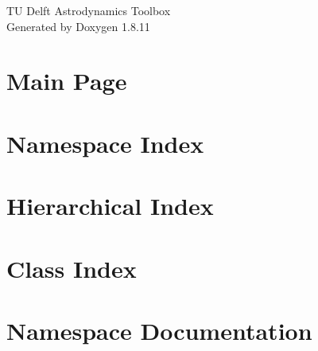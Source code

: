 \documentclass[twoside]{book}
\newcommand{\+}{\discretionary{\mbox{\scriptsize$\hookleftarrow$}}{}{}}
\newcommand{\clearemptydoublepage}{%
  \newpage{\pagestyle{empty}\cleardoublepage}%
}
\begin{document}
\hypersetup{pageanchor=false,
             bookmarksnumbered=true,
             pdfencoding=unicode
            }
\begin{titlepage}
\vspace*{7cm}
\begin{center}%
{\Large TU Delft Astrodynamics Toolbox }\\
\vspace*{1cm}
{\large Generated by Doxygen 1.8.11}\\
\end{center}
\end{titlepage}
\clearemptydoublepage
\tableofcontents
\clearemptydoublepage
{}
\hypersetup{pageanchor=true}

\chapter{Main Page}
\label{index}\hypertarget{index}{}
\chapter{Namespace Index}

\chapter{Hierarchical Index}

\chapter{Class Index}

\chapter{Namespace Documentation}


\end{document}
